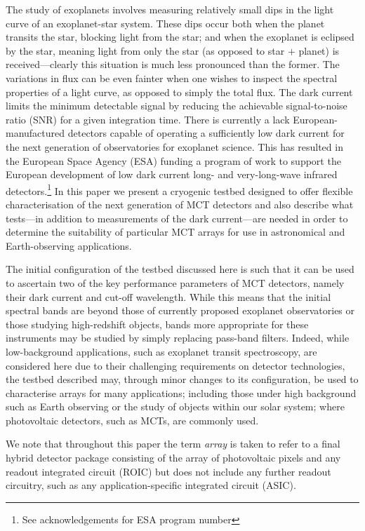 \documentclass{spie}
\begin{document}
The study of exoplanets involves measuring relatively small dips in the light curve of an exoplanet-star system. These dips occur both when the planet transits the star, blocking light from the star; and when the exoplanet is eclipsed by the star, meaning light from only the star (as opposed to star $+$ planet) is received---clearly this situation is much less pronounced than the former. The variations in flux can be even fainter when one wishes to inspect the spectral properties of a light curve, as opposed to simply the total flux. The dark current limits the minimum detectable signal by reducing the achievable signal-to-noise ratio (SNR) for a given integration time. There is currently a lack European-manufactured detectors capable of operating a sufficiently low dark current for the next generation of observatories for exoplanet science. This has resulted in the European Space Agency (ESA) funding a program of work to support the European development of low dark current long- and very-long-wave infrared detectors.\footnote{See acknowledgements for ESA program number} In this paper we present a cryogenic testbed designed to offer flexible characterisation of the next generation of MCT detectors and also describe what tests---in addition to measurements of the dark current---are needed in order to determine the suitability of particular MCT arrays for use in astronomical and Earth-observing applications.
\par 
The initial configuration of the testbed discussed here is such that it can be used to ascertain two of the key performance parameters of MCT detectors, namely their dark current and cut-off wavelength. While this means that the initial spectral bands are beyond those of currently proposed exoplanet observatories\cite{Tinetti2015} or those studying high-redshift objects\cite{Flare2016}, bands more appropriate for these instruments may be studied by simply replacing pass-band filters. Indeed, while low-background applications, such as exoplanet transit spectroscopy, are considered here due to their challenging requirements on detector technologies, the testbed described may, through minor changes to its configuration, be used to characterise arrays for many applications; including those under high background such as Earth observing or the study of objects within our solar system; where photovoltaic detectors, such as MCTs, are commonly used.\cite{Donlon2012,Sonnabend2008}
\par 
We note that throughout this paper the term \textit{array} is taken to refer to a final hybrid detector package consisting of the array of photovoltaic pixels and any readout integrated circuit (ROIC) but does not include any further readout circuitry, such as any application-specific integrated circuit (ASIC).
\end{document}
